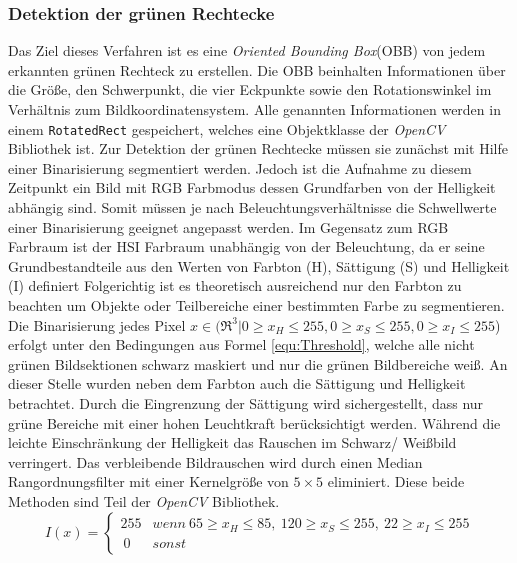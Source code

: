 \subsubsection{Detektion der grünen Rechtecke}
Das Ziel dieses Verfahren ist es eine \textit{Oriented Bounding Box}(OBB) von jedem erkannten grünen Rechteck zu erstellen. Die OBB beinhalten Informationen über die Größe, den Schwerpunkt, die vier Eckpunkte sowie den Rotationswinkel im Verhältnis zum Bildkoordinatensystem. Alle genannten Informationen werden in einem \texttt{RotatedRect} gespeichert, welches eine Objektklasse der \textit{OpenCV} Bibliothek ist.
Zur Detektion der grünen Rechtecke müssen sie zunächst mit Hilfe einer Binarisierung segmentiert werden. Jedoch ist die Aufnahme zu diesem Zeitpunkt ein Bild mit RGB Farbmodus dessen Grundfarben von der Helligkeit abhängig sind. Somit müssen je nach Beleuchtungsverhältnisse die Schwellwerte einer Binarisierung geeignet angepasst werden. Im Gegensatz zum RGB Farbraum ist der HSI Farbraum unabhängig von der Beleuchtung, da er seine Grundbestandteile aus den Werten von Farbton (H), Sättigung (S) und Helligkeit (I) definiert Folgerichtig ist es theoretisch ausreichend nur den Farbton zu beachten um Objekte oder Teilbereiche einer bestimmten Farbe zu segmentieren.
Die Binarisierung jedes Pixel $x \in (\Re^3 | 0 \ge x_H \le 255, 0 \ge x_S \le 255, 0 \ge x_I \le 255$) erfolgt unter den Bedingungen aus Formel \ref{equ:Threshold}, welche alle nicht grünen Bildsektionen schwarz maskiert und nur die grünen Bildbereiche weiß. An dieser Stelle wurden neben dem Farbton auch die Sättigung und Helligkeit betrachtet. Durch die Eingrenzung der Sättigung wird sichergestellt, dass nur grüne Bereiche mit einer hohen Leuchtkraft berücksichtigt werden. Während die leichte Einschränkung der Helligkeit das Rauschen im Schwarz/ Weißbild verringert. Das verbleibende Bildrauschen wird durch einen Median Rangordnungsfilter mit einer Kernelgröße von $5\times5$ eliminiert. Diese beide Methoden sind Teil der \textit{OpenCV} Bibliothek.
\begin{equation}
\label{equ:Threshold}
I(x) = \begin{cases}
255 & wenn \ 65 \ge x_H \le 85, \ 120 \ge x_S \le 255, \ 22 \ge x_I \le 255\\\
0 & sonst
\end{cases}
\end{equation}

